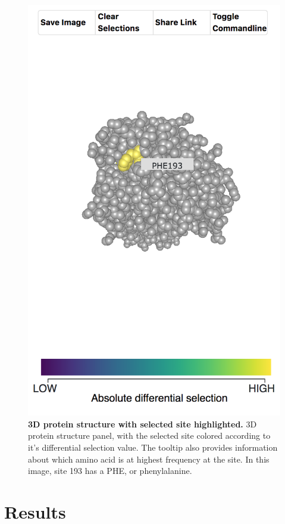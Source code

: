 \documentclass[sigchi]{acmart}
\begin{document}
\begin{figure}[H]
	\includegraphics[width=1.0\textwidth]{3d-structure-panel.png}
	\caption{\textbf{3D protein structure with selected site highlighted.}
  3D protein structure panel, with the selected site colored according to it's differential selection value. The tooltip also provides information about which amino acid is at highest frequency at the site. In this image, site 193 has a PHE, or phenylalanine.
  }
	\label{3d-structure}
\end{figure}

\section{Results}
\end{document}
